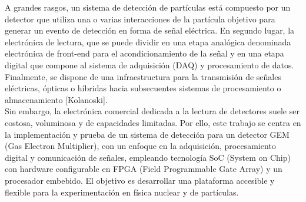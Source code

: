 \documentclass[]{book}
\begin{document}

\noindent A grandes rasgos, un sistema de detección de partículas está compuesto por un detector que utiliza una o varias interacciones de la partícula objetivo para generar un evento de detección en forma de señal eléctrica. En segundo lugar, la electrónica de lectura, que se puede dividir en una etapa analógica denominada electrónica de front-end para el acondicionamiento de la señal y en una etapa digital que compone al sistema de adquisición (DAQ) y procesamiento de datos. Finalmente, se dispone de una infraestructura para la transmisión de señales eléctricas, ópticas o híbridas hacia subsecuentes sistemas de procesamiento o almacenamiento [Kolanoski].\\


\noindent Sin embargo, la electrónica comercial dedicada a la lectura de detectores suele ser costosa, voluminosa y de capacidades limitadas. Por ello, este trabajo se centra en la implementación y prueba de un sistema de detección para un detector GEM (Gas Electron Multiplier), con un enfoque en la adquisición, procesamiento digital y comunicación de señales, empleando tecnología SoC (System on Chip) con hardware configurable en FPGA (Field Programmable Gate Array) y un procesador embebido. El objetivo es desarrollar una plataforma accesible y flexible para la experimentación en física nuclear y de partículas.
\end{document}
